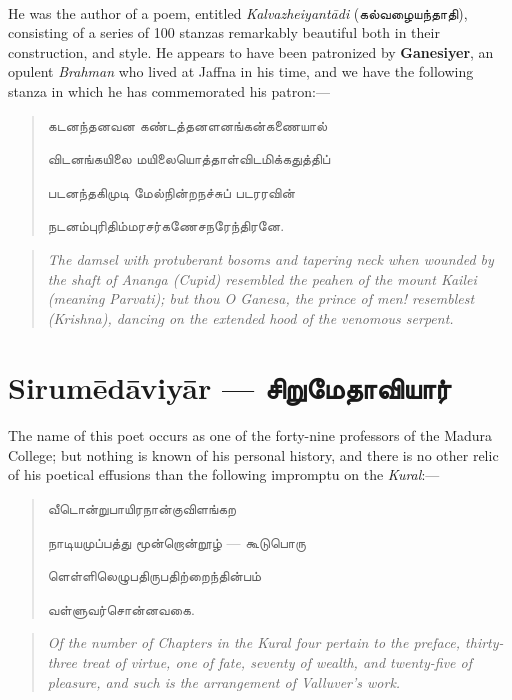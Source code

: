 \documentclass{article}
\newcommand{\TamilText}[1]{\texttamil{#1}}
\newcommand{\TamilBold}[1]{\texttamil{\textbf{#1}}}
\newcommand{\tam}[1]{\TamilText{#1}}
\newcommand{\tambold}[1]{\TamilBold{#1}}
\begin{document}
\paragraph{}
He was the author of a poem, entitled \emph{Kalvazheiyant\={a}di} (\tam{கல்வழையந்தாதி}), consisting of a series of 100 stanzas remarkably beautiful both in their construction, and style. He appears to have been patronized by \textbf{Ganesiyer}, an opulent \emph{Brahman} who lived at Jaffna in his time, and we have the following stanza in which he has commemorated his patron:---
\begin{quotation}\small
\tam{கடனந்தனவன கண்டத்தனளனங்கன்கணையால்‌}

\tam{விடனங்கயிலை மயிலையொத்தாள்விடமிக்கதுத்திப்‌}

\tam{படனந்தகிமுடி மேல்நின்றநச்சுப்‌ படரரவின்‌}

\tam{நடனம்புரிதிம்மரசர்கணேசநரேந்திரனே}.
\end{quotation}
\begin{quotation}\small
\emph{The damsel with protuberant bosoms and tapering neck when wounded by the shaft of Ananga (Cupid) resembled the peahen of the mount Kailei (meaning Parvati); but thou O Ganesa, the prince of men! resemblest (Krishna), dancing on the extended hood of the venomous serpent.}
\end{quotation}

\section{Sirum\={e}d\={a}viy\={a}r --- \tambold{சிறுமேதாவியார்}}
\paragraph{}
The name of this poet occurs as one of the forty-nine professors of the Madura College; but nothing is known of his personal history, and there is no other relic of his poetical effusions than the following impromptu on the \emph{Kural}:---
\begin{quotation}\small
\tam{வீடொன்றுபாயிரநான்குவிளங்கற}

\tam{நாடியமுப்பத்து மூன்றொன்றூழ்‌} --- \tam{கூடுபொரு}

\tam{ளெள்ளிலெழுபதிருபதிற்றைந்தின்பம்‌}

\tam{வள்ளுவர்சொன்னவகை}.
\end{quotation}
\begin{quotation}\small
\emph{Of the number of Chapters in the Kural four pertain to the preface, thirty-three treat of virtue, one of fate, seventy of wealth, and twenty-five of pleasure, and such is the arrangement of Valluver's work.}
\end{quotation}
\end{document}

